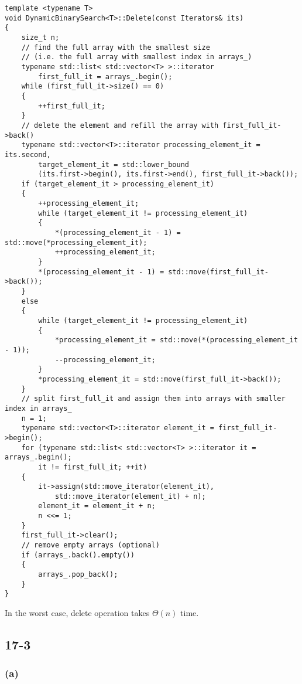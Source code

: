 \begin{verbatim}
template <typename T>
void DynamicBinarySearch<T>::Delete(const Iterators& its)
{
    size_t n;
    // find the full array with the smallest size 
    // (i.e. the full array with smallest index in arrays_)
    typename std::list< std::vector<T> >::iterator 
        first_full_it = arrays_.begin();
    while (first_full_it->size() == 0)
    {
        ++first_full_it;
    }
    // delete the element and refill the array with first_full_it->back()
    typename std::vector<T>::iterator processing_element_it = its.second,
        target_element_it = std::lower_bound
        (its.first->begin(), its.first->end(), first_full_it->back());
    if (target_element_it > processing_element_it)
    {
        ++processing_element_it;
        while (target_element_it != processing_element_it)
        {
            *(processing_element_it - 1) = std::move(*processing_element_it);
            ++processing_element_it;
        }
        *(processing_element_it - 1) = std::move(first_full_it->back());
    }
    else
    {
        while (target_element_it != processing_element_it)
        {
            *processing_element_it = std::move(*(processing_element_it - 1));
            --processing_element_it;
        }
        *processing_element_it = std::move(first_full_it->back());
    }
    // split first_full_it and assign them into arrays with smaller index in arrays_
    n = 1;
    typename std::vector<T>::iterator element_it = first_full_it->begin();
    for (typename std::list< std::vector<T> >::iterator it = arrays_.begin();
        it != first_full_it; ++it)
    {
        it->assign(std::move_iterator(element_it), 
            std::move_iterator(element_it) + n);
        element_it = element_it + n;
        n <<= 1;
    }
    first_full_it->clear();
    // remove empty arrays (optional)
    if (arrays_.back().empty())
    {
        arrays_.pop_back();
    }
}
\end{verbatim}

In the worst case, delete operation takes $\Theta(n)$ time.

\subsection*{17-3}

\subsubsection*{(a)}

